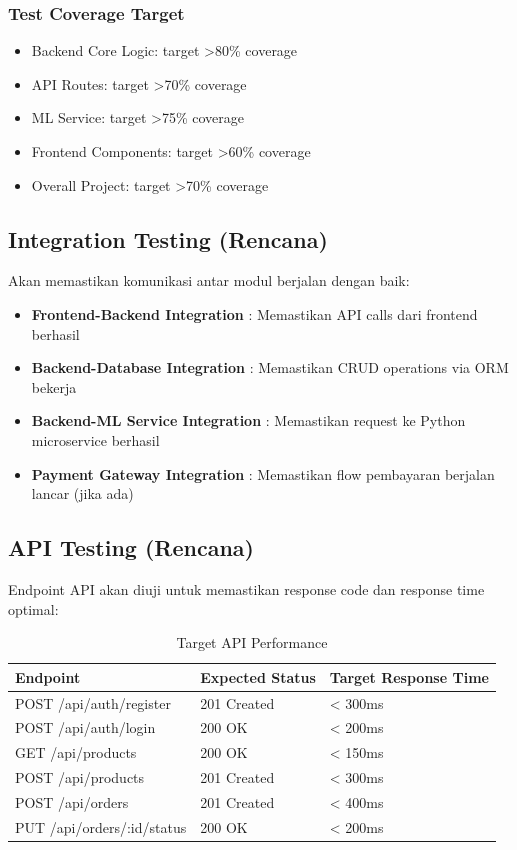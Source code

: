 \subsubsection{Test Coverage Target}
\begin{itemize}[leftmargin=*]
    \item Backend Core Logic: target >80\% coverage
    \item API Routes: target >70\% coverage
    \item ML Service: target >75\% coverage
    \item Frontend Components: target >60\% coverage
    \item Overall Project: target >70\% coverage
\end{itemize}

\subsection{Integration Testing (Rencana)}

Akan memastikan komunikasi antar modul berjalan dengan baik:

\begin{itemize}[leftmargin=*]
    \item \textbf{Frontend-Backend Integration} : Memastikan API calls dari frontend berhasil
    \item \textbf{Backend-Database Integration} : Memastikan CRUD operations via ORM bekerja
    \item \textbf{Backend-ML Service Integration} : Memastikan request ke Python microservice berhasil
    \item \textbf{Payment Gateway Integration} : Memastikan flow pembayaran berjalan lancar (jika ada)
\end{itemize}

\subsection{API Testing (Rencana)}

Endpoint API akan diuji untuk memastikan response code dan response time optimal:

\begin{table}[H]
\centering
\caption{Target API Performance}
\label{tab:api_testing}
\begin{tabularx}{\textwidth}{|l|X|X|}
\hline
\textbf{Endpoint} & \textbf{Expected Status} & \textbf{Target Response Time} \\
\hline
POST /api/auth/register & 201 Created & < 300ms \\
\hline
POST /api/auth/login & 200 OK & < 200ms \\
\hline
GET /api/products & 200 OK & < 150ms \\
\hline
POST /api/products & 201 Created & < 300ms \\
\hline
POST /api/orders & 201 Created & < 400ms \\
\hline
PUT /api/orders/:id/status & 200 OK & < 200ms \\
\hline
\end{tabularx}
\end{table}

